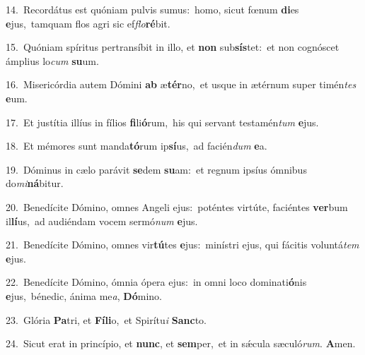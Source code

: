 {\numbfont\textcolor{\numbcolor}{14.}}~Recordátus est quóniam pulvis sumus:~\dagger homo, sicut fœnum \textbf{di}\-es \textbf{e}\-jus,~\star tamquam flos agri sic ef\-\textit{flo}\-\textbf{ré}bit.\par
{\numbfont\textcolor{\numbcolor}{15.}}~Quóniam spíritus pertransíbit in illo, et \textbf{non} sub\-\textbf{sís}\-tet:~\star et non cognóscet ámplius lo\textit{cum} \textbf{su}\-um.\par
{\numbfont\textcolor{\numbcolor}{16.}}~Misericórdia autem Dómini \textbf{ab} æ\-\textbf{tér}\-no,~\star et usque in ætérnum super timén\textit{tes} \textbf{e}\-um.\par
{\numbfont\textcolor{\numbcolor}{17.}}~Et justítia illíus in fílios \textbf{fi}\-li\-\textbf{ó}\-rum,~\star his qui servant testamén\textit{tum} \textbf{e}\-jus.\par
{\numbfont\textcolor{\numbcolor}{18.}}~Et mémores sunt manda\-\textbf{tó}\-rum ip\-\textbf{sí}\-us,~\star ad facién\textit{dum} \textbf{e}\-a.\par
{\numbfont\textcolor{\numbcolor}{19.}}~Dóminus in cælo parávit \textbf{se}\-dem \textbf{su}\-am:~\star et regnum ipsíus ómnibus do\-\textit{mi}\-\textbf{ná}bitur.\par
{\numbfont\textcolor{\numbcolor}{20.}}~Benedícite Dómino, omnes Angeli ejus:~\dagger poténtes virtúte, faciéntes \textbf{ver}\-bum il\-\textbf{lí}\-us,~\star ad audiéndam vocem sermó\textit{num} \textbf{e}\-jus.\par
{\numbfont\textcolor{\numbcolor}{21.}}~Benedícite Dómino, omnes vir\-\textbf{tú}\-tes \textbf{e}\-jus:~\star minístri ejus, qui fácitis voluntá\textit{tem} \textbf{e}\-jus.\par
{\numbfont\textcolor{\numbcolor}{22.}}~Benedícite Dómino, ómnia ópera ejus:~\dagger in omni loco dominati\-\textbf{ó}\-nis \textbf{e}\-jus,~\star bénedic, ánima me\-\textit{a}\-, \textbf{Dó}\-mino.\par
{\numbfont\textcolor{\numbcolor}{23.}}~Glória \textbf{Pa}\-tri, et \textbf{Fí}\-\textbf{li}o,~\star et Spirítu\textit{i} \textbf{Sanc}\-to.\par
{\numbfont\textcolor{\numbcolor}{24.}}~Sicut erat in princípio, et \textbf{nunc}\-, et \textbf{sem}\-per,~\star et in sǽcula sæculó\-\textit{rum}\-. \textbf{A}\-men.\par
